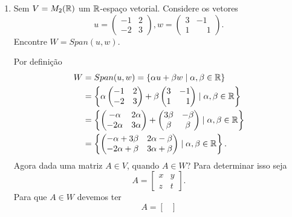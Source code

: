 \begin{exemplos}
\begin{enumerate}
        \item Sem $V = M_2(\mathbb{R})$ um $\mathbb{R}$-espaço vetorial. Considere os vetores
        \[
            u = \begin{pmatrix}
                -1 & 2\\-2 & 3
            \end{pmatrix},
            w = \begin{pmatrix}
                3 & -1\\1 & \phantom{-}1
            \end{pmatrix}.
        \]
        Encontre $W = Span(u, w)$.
        \begin{solucao}
            Por definição
            \begin{align*}
                W &= Span(u, w) = \{\alpha u + \beta w \mid \alpha, \beta \in \mathbb{R}\} \\ &= \left\{\alpha\begin{pmatrix}-1 & 2\\-2 & 3\end{pmatrix} + \beta \begin{pmatrix}3 & -1\\1 & \phantom{-}1\end{pmatrix} \mid \alpha, \beta \in \mathbb{R}\right\} \\ &= \left\{\begin{pmatrix}-\alpha & 2\alpha\\-2\alpha & 3\alpha\end{pmatrix} + \begin{pmatrix}3\beta & -\beta\\\beta & \beta\end{pmatrix} \mid \alpha, \beta \in \mathbb{R}\right\} \\ &= \left\{\begin{pmatrix}-\alpha + 3\beta & 2\alpha - \beta\\-2\alpha + \beta & 3\alpha + \beta\end{pmatrix} \mid \alpha, \beta \in \mathbb{R}\right\}.
            \end{align*}
            Agora dada uma matriz $A \in V$, quando $A \in W$? Para determinar isso seja
            \[
                A = \begin{bmatrix}
                    x & y\\
                    z & t
                \end{bmatrix}.
            \]
            Para que $A \in W$ devemos ter
            \[
            A = \begin{bmatrix}

\end{bmatrix}\]
\end{solucao}
\end{enumerate}
\end{exemplos}
